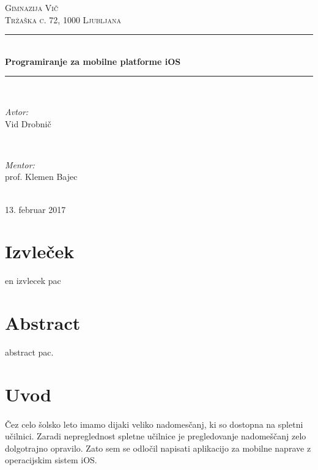 \documentclass[a4paper, 12pt]{article}
\begin{document}
	\begin{titlepage}
		\newcommand{\HRule}{\rule{\linewidth}{0.5mm}}
		\center
		
		\textsc{\LARGE Gimnazija Vič}\\[0.5cm]
		\textsc{\Large Tržaška c. 72, 1000 Ljubljana}\\[1.5cm]

		\HRule \\[0.4cm]
		{ \huge \bfseries Programiranje za mobilne platforme iOS}\\[0.4cm]
		\HRule \\[1.5cm]
		
		\begin{minipage}{0.4\textwidth}
			\begin{flushleft} \large
				\emph{Avtor:}\\
				Vid Drobnič
			\end{flushleft}
		\end{minipage}
		~
		\begin{minipage}{0.4\textwidth}
			\begin{flushright} \large
				\emph{Mentor:} \\
				prof. Klemen Bajec
			\end{flushright}
		\end{minipage}\\[4cm]
		
		{\large 13. februar 2017}\\[3cm]
		\vfill
	\end{titlepage}
	
	\section*{Izvleček}
	en izvlecek pac
	
	\section*{Abstract}
	abstract pac.
	
	\pagebreak
	
	\tableofcontents
	\pagebreak
	
	\section{Uvod}
	\paragraph{} Čez celo šolsko leto imamo dijaki veliko nadomesčanj, ki so dostopna na spletni učilnici. Zaradi nepreglednost spletne učilnice je pregledovanje nadomeščanj zelo dolgotrajno opravilo. Zato sem se odločil napisati aplikacijo za mobilne naprave z operacijskim sistem iOS.
	
\end{document}
